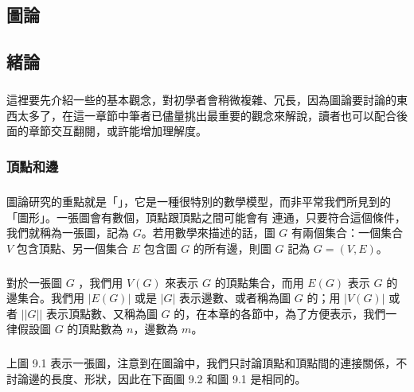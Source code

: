 \documentclass[12pt,a4paper,oneside]{report}
\begin{document}
\begin{CJK}{UTF8}{bkai}
\fi

\providecommand*{\Edge}[2]{\ensuremath{({#1},{#2})}}
\providecommand*{\DEdge}[2]{\ensuremath{\langle{}{{#1},{#2}}\rangle{}}}
\providecommand*{\Deg}[2][G]{\ensuremath{d_{#1}{(#2)}}}
\providecommand*{\OutDeg}[2][G]{\ensuremath{d^{+}_{#1}{(#2)}}}
\providecommand*{\InDeg}[2][G]{\ensuremath{d^{-}_{#1}{(#2)}}}
\chapter{圖論}

\section{緒論}
\paragraph{}這裡要先介紹一些的基本觀念，對初學者會稍微複雜、冗長，因為圖論要討論的東西太多了，在這一章節中筆者已儘量挑出最重要的觀念來解說，讀者也可以配合後面的章節交互翻閱，或許能增加理解度。

\subsection{頂點和邊}
\paragraph{}圖論研究的重點就是「\textbf{}」，它是一種很特別的數學模型，而非平常我們所見到的「圖形」。一張圖會有數個\textbf{}，頂點跟頂點之間可能會有\textbf{} 連通，只要符合這個條件，我們就稱為一張圖，記為 $G$。若用數學來描述的話，圖 $G$ 有兩個集合：一個集合 $V$ 包含頂點、另一個集合 $E$ 包含圖 $G$ 的所有邊，則圖 $G$ 記為 $G=(V,E)$。
\paragraph{}對於一張圖 $G$ ，我們用 $V(G)$ 來表示 $G$ 的頂點集合，而用 $E(G)$ 表示 $G$ 的邊集合。我們用 $|E(G)|$ 或是 $|G|$ 表示邊數、或者稱為圖 $G$ 的；用 $|V(G)|$ 或者 $||G||$ 表示頂點數、又稱為圖 $G$ 的，在本章的各節中，為了方便表示，我們一律假設圖 $G$ 的頂點數為 $n$，邊數為 $m$。
\paragraph{}上圖 9.1 表示一張圖，注意到在圖論中，我們只討論頂點和頂點間的連接關係，不討論邊的長度、形狀，因此在下面圖 9.2 和圖 9.1 是相同的。

\end{CJK}
\end{document}
